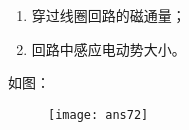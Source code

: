 \begin{enumerate}
    \begin{enumerate}[label=(\arabic*)]
        \item 穿过线圈回路的磁通量；
        \item 回路中感应电动势大小。
    \end{enumerate}
    \begin{solution}
        如图：
        \begin{figure}[H]
            \centering
            \texttt{[image: ans72]}
        \end{figure}
    \end{solution}
\end{enumerate}